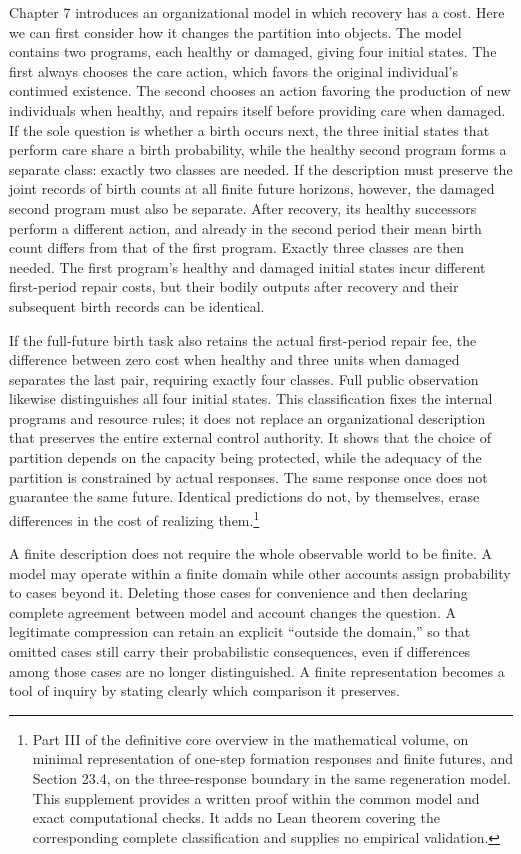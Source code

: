 \documentclass[
  english,
  11pt,
  oneside]{book}
\begin{document}
Chapter 7 introduces an organizational model in which recovery has a cost. Here we can first consider how it changes the partition into objects. The model contains two programs, each healthy or damaged, giving four initial states. The first always chooses the care action, which favors the original individual's continued existence. The second chooses an action favoring the production of new individuals when healthy, and repairs itself before providing care when damaged. If the sole question is whether a birth occurs next, the three initial states that perform care share a birth probability, while the healthy second program forms a separate class: exactly two classes are needed. If the description must preserve the joint records of birth counts at all finite future horizons, however, the damaged second program must also be separate. After recovery, its healthy successors perform a different action, and already in the second period their mean birth count differs from that of the first program. Exactly three classes are then needed. The first program's healthy and damaged initial states incur different first-period repair costs, but their bodily outputs after recovery and their subsequent birth records can be identical.

If the full-future birth task also retains the actual first-period repair fee, the difference between zero cost when healthy and three units when damaged separates the last pair, requiring exactly four classes. Full public observation likewise distinguishes all four initial states. This classification fixes the internal programs and resource rules; it does not replace an organizational description that preserves the entire external control authority. It shows that the choice of partition depends on the capacity being protected, while the adequacy of the partition is constrained by actual responses. The same response once does not guarantee the same future. Identical predictions do not, by themselves, erase differences in the cost of realizing them.\footnote{\hypertarget{ph-note-5}{}Part III of the definitive core overview in the mathematical volume, on minimal representation of one-step formation responses and finite futures, and Section 23.4, on the three-response boundary in the same regeneration model. This supplement provides a written proof within the common model and exact computational checks. It adds no Lean theorem covering the corresponding complete classification and supplies no empirical validation.}

A finite description does not require the whole observable world to be finite. A model may operate within a finite domain while other accounts assign probability to cases beyond it. Deleting those cases for convenience and then declaring complete agreement between model and account changes the question. A legitimate compression can retain an explicit ``outside the domain,'' so that omitted cases still carry their probabilistic consequences, even if differences among those cases are no longer distinguished. A finite representation becomes a tool of inquiry by stating clearly which comparison it preserves.
\end{document}
